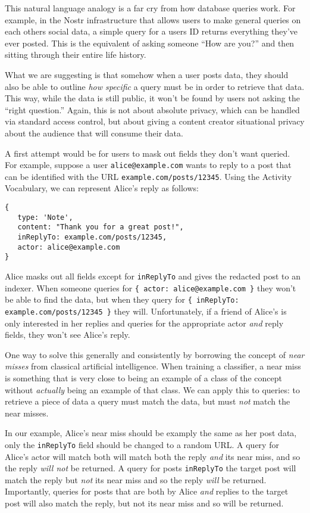 This natural language analogy is a far cry from how database queries work.
For example, in the Nostr infrastructure that allows users to make general queries on each others social data, a simple query for a users ID returns everything they've ever posted. This is the equivalent of asking someone ``How are you?'' and then sitting through their entire life history.

What we are suggesting is that somehow when a user posts data, they should also be able to outline \emph{how specific} a query must be in order to retrieve that data.
This way, while the data is still public, it won't be found by users not asking the ``right question.''
Again, this is not about absolute privacy, which can be handled via standard access control, but about giving a content creator situational privacy about the audience that will consume their data.

A first attempt would be for users to mask out fields they don't want queried.
For example, suppose a user \texttt{alice@example.com} wants to reply to a post that can be identified with the URL \texttt{example.com/posts/12345}.
Using the Activity Vocabulary, we can represent Alice's reply as follows:

\begin{verbatim}
{
   type: 'Note',
   content: "Thank you for a great post!",
   inReplyTo: example.com/posts/12345,
   actor: alice@example.com
}
\end{verbatim}

Alice masks out all fields except for \texttt{inReplyTo} and gives the redacted post to an indexer.
When someone queries for \texttt{\{ actor: alice@example.com \}} they won't be able to find the data, but when they query for \texttt{\{ inReplyTo: example.com/posts/12345 \}} they will.
Unfortunately, if a friend of Alice's is only interested in her replies and queries for the appropriate actor \emph{and} reply fields, they won't see Alice's reply.

One way to solve this generally and consistently by borrowing the concept of \emph{near misses} from classical artificial intelligence.
When training a classifier, a near miss is something that is very close to being an example of a class of the concept without \emph{actually} being an example of that class.
We can apply this to queries: to retrieve a piece of data a query must match the data, but must \emph{not} match the near misses.

In our example, Alice's near miss should be examply the same as her post data, only
the \texttt{inReplyTo} field should be changed to a random URL.
A query for Alice's actor will match both will match both the reply \emph{and} its near miss, and so the reply \emph{will not} be returned.
A query for posts \texttt{inReplyTo} the target post will match the reply but \emph{not} its near miss and so the reply \emph{will} be returned.
Importantly, queries for posts that are both by Alice \emph{and} replies to the target post will also match the reply, but not its near miss and so will be returned.

